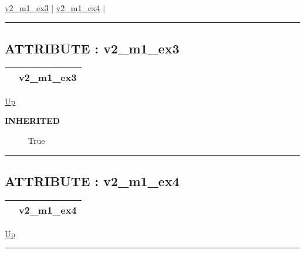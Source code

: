 \par


\hyperlink{ecldoc:inintest.example_3.mod_1.v2_m1_ex3}{v2\_m1\_ex3}  |
\hyperlink{ecldoc:example_4.mod_1.v2_m1_ex4}{v2\_m1\_ex4}  |

\rule{\textwidth}{0.4pt}

\subsection*{ATTRIBUTE : v2\_m1\_ex3}
\hypertarget{ecldoc:inintest.example_3.mod_1.v2_m1_ex3}{}

{\renewcommand{\arraystretch}{1.5}
\begin{tabularx}{\textwidth}{|>{\raggedright\arraybackslash}l|X|}
\hline
\hspace{0pt} & v2\_m1\_ex3 \\
\hline
\end{tabularx}
}

\hyperlink{ecldoc:example_4.mod_1}{Up}

\par

\par
\begin{description}
\item [\textbf{INHERITED}] True
\end{description}

\rule{\textwidth}{0.4pt}
\subsection*{ATTRIBUTE : v2\_m1\_ex4}
\hypertarget{ecldoc:example_4.mod_1.v2_m1_ex4}{}

{\renewcommand{\arraystretch}{1.5}
\begin{tabularx}{\textwidth}{|>{\raggedright\arraybackslash}l|X|}
\hline
\hspace{0pt} & v2\_m1\_ex4 \\
\hline
\end{tabularx}
}

\hyperlink{ecldoc:example_4.mod_1}{Up}

\par


\rule{\textwidth}{0.4pt}




